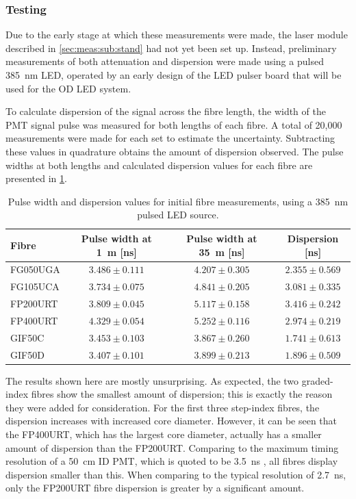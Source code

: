 \documentclass[a4paper,11pt]{article}
\begin{document}
\subsubsection{Testing}\label{sec:meas:sub:init:sub:test}

Due to the early stage at which these measurements were made, the laser module described in \cref{sec:meas:sub:stand} had not yet been set up. Instead, preliminary measurements of both attenuation and dispersion were made using a pulsed 385~nm LED, operated by an early design of the LED pulser board that will be used for the OD LED system.

To calculate dispersion of the signal across the fibre length, the width of the PMT signal pulse was measured for both lengths of each fibre. A total of 20,000 measurements were made for each set to estimate the uncertainty. Subtracting these values in quadrature obtains the amount of dispersion observed. The pulse widths at both lengths and calculated dispersion values for each fibre are presented in \cref{tab:dispinit}.
\begin{table}[h]
\centering
\begin{tabular}{lccc}
\hline
Fibre	   & Pulse width at 1~m [ns]  & Pulse width at 35~m [ns] &  Dispersion [ns]		\\ \hline
FG050UGA   &  $3.486\pm0.111$	      &  $4.207\pm0.305$         &  $2.355\pm0.569$     \\
FG105UCA   &  $3.734\pm0.075$	      &  $4.841\pm0.205$ 		 &  $3.081\pm0.335$     \\
FP200URT   &  $3.809\pm0.045$	      &  $5.117\pm0.158$	   	 &  $3.416\pm0.242$     \\
FP400URT   &  $4.329\pm0.054$	      &  $5.252\pm0.116$ 		 &  $2.974\pm0.219$     \\
GIF50C     &  $3.453\pm0.103$    	  &  $3.867\pm0.260$ 	     &  $1.741\pm0.613$     \\
GIF50D     &  $3.407\pm0.101$		  &  $3.899\pm0.213$ 		 &  $1.896\pm0.509$     \\ \hline
\end{tabular}
\caption{Pulse width and dispersion values for initial fibre measurements, using a 385~nm pulsed LED source.}\label{tab:dispinit}
\end{table}
The results shown here are mostly unsurprising. As expected, the two graded-index fibres show the smallest amount of dispersion; this is exactly the reason they were added for consideration. For the first three step-index fibres, the dispersion increases with increased core diameter. However, it can be seen that the FP400URT, which has the largest core diameter, actually has a smaller amount of dispersion than the FP200URT. Comparing to the maximum timing resolution of a 50~cm ID PMT, which is quoted to be 3.5~ns \cite{bib:hkpmt}, all fibres display dispersion smaller than this. When comparing to the typical resolution of 2.7~ns, only the FP200URT fibre dispersion is greater by a significant amount.
\end{document}
